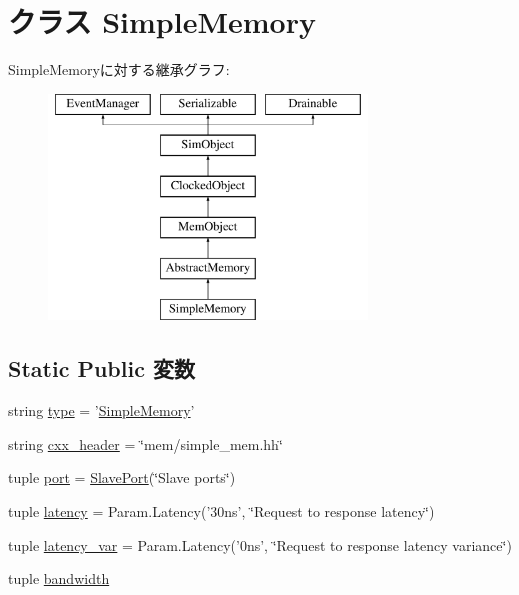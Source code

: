 \hypertarget{classSimpleMemory_1_1SimpleMemory}{
\section{クラス SimpleMemory}
\label{classSimpleMemory_1_1SimpleMemory}
}
SimpleMemoryに対する継承グラフ:\begin{figure}[H]
\begin{center}
\leavevmode
\includegraphics[height=6cm]{classSimpleMemory_1_1SimpleMemory}
\end{center}
\end{figure}
\subsection*{Static Public 変数}
\begin{DoxyCompactItemize}
\item 
string \hyperlink{classSimpleMemory_1_1SimpleMemory_acce15679d830831b0bbe8ebc2a60b2ca}{type} = '\hyperlink{classSimpleMemory_1_1SimpleMemory}{SimpleMemory}'
\item 
string \hyperlink{classSimpleMemory_1_1SimpleMemory_a17da7064bc5c518791f0c891eff05fda}{cxx\_\-header} = \char`\"{}mem/simple\_\-mem.hh\char`\"{}
\item 
tuple \hyperlink{classSimpleMemory_1_1SimpleMemory_a1aadf525515ecfcf662c2aa51a503763}{port} = \hyperlink{classSlavePort}{SlavePort}(\char`\"{}Slave ports\char`\"{})
\item 
tuple \hyperlink{classSimpleMemory_1_1SimpleMemory_ab6371bb71615c96debd0d27d34943fed}{latency} = Param.Latency('30ns', \char`\"{}Request to response latency\char`\"{})
\item 
tuple \hyperlink{classSimpleMemory_1_1SimpleMemory_af62664fa3e093f2a1bd74450f562378f}{latency\_\-var} = Param.Latency('0ns', \char`\"{}Request to response latency variance\char`\"{})
\item 
tuple \hyperlink{classSimpleMemory_1_1SimpleMemory_a8ab981a84df29d9ad0abdebcf7f8c0b5}{bandwidth}
\end{DoxyCompactItemize}


